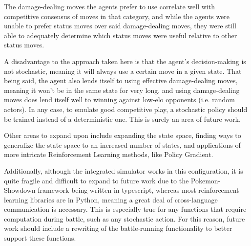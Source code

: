 \documentclass{article}
\begin{document}
\quad The damage-dealing moves the agents prefer to use correlate well with competitive consensus of moves in that category, and while the agents were unable to prefer status moves over said damage-dealing moves, they were still able to adequately determine which status moves were useful relative to other status moves.

\quad A disadvantage to the approach taken here is that the agent's decision-making is not stochastic, meaning it will always use a certain move in a given state. That being said, the agent also lends itself to using effective damage-dealing moves, meaning it won't be in the same state for very long, and using damage-dealing moves does lend itself well to winning against low-elo opponents (i.e. random actors). In any case, to emulate good competitive play, a stochastic policy should be trained instead of a deterministic one. This is surely an area of future work.

\quad Other areas to expand upon include expanding the state space, finding ways to generalize the state space to an increased number of states, and applications of more intricate Reinforcement Learning methods, like Policy Gradient.

\quad Additionally, although the integrated simulator works in this configuration, it is quite fragile and difficult to expand to future work due to the Pokemon-Showdown framework being written in typescript, whereas most reinforcement learning libraries are in Python, meaning a great deal of cross-language communication is necessary. This is especially true for any functions that require computation during battle, such as any stochastic action. For this reason, future work should include a rewriting of the battle-running functionality to better support these functions.



\clearpage

\end{document}
